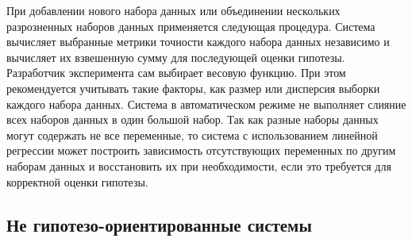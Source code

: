 При добавлении нового набора данных или объединении нескольких разрозненных наборов данных применяется следующая 
процедура. Система вычисляет выбранные метрики точности каждого набора данных независимо и вычисляет их взвешенную 
сумму для последующей оценки гипотезы. Разработчик эксперимента сам выбирает весовую функцию. При этом рекомендуется 
учитывать такие факторы, как размер или дисперсия выборки каждого набора данных. Система в автоматическом режиме не 
выполняет слияние всех наборов данных в один большой набор. Так как разные наборы данных могут содержать не все 
переменные, то система с использованием линейной регрессии может построить зависимость отсутствующих переменных по 
другим наборам данных и восстановить их при необходимости, если это требуется для корректной оценки гипотезы.

\subsection{Не гипотезо-ориентированные системы}\label{sect1_3_5}

